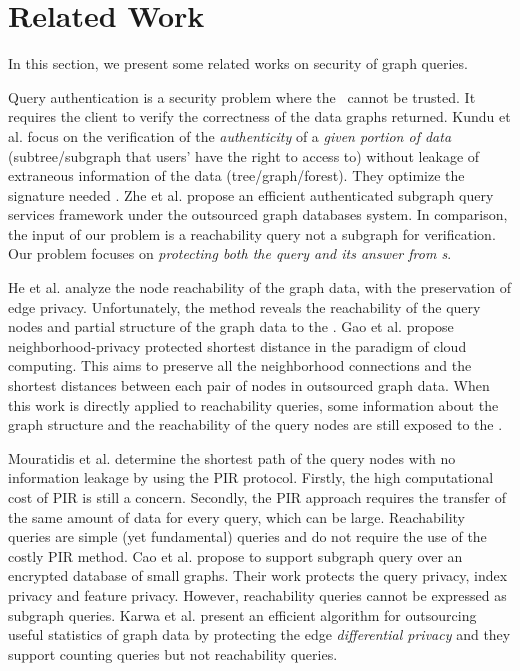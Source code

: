 \vspace{-2ex}
\section{Related Work}
\label{sec:related}
\vspace{-2ex}

In this section, we present some related works on security of
graph queries. 


\stab
{} Query authentication
is a security problem where the \SP\ cannot be trusted. It requires the client to verify the correctness
of the data graphs returned.  Kundu et
al. \cite{auth_graph_wo_leaking,signature, forest} focus on the verification of the {\em authenticity} of a
{\em given portion of data} (subtree/subgraph that users' have the
right to access to) without leakage of extraneous information of the
data (tree/graph/forest). They optimize the signature needed
\cite{forest, signature}. 
Zhe et al. \cite{zhe} propose an efficient authenticated subgraph query
services framework under the outsourced graph databases system. 
In comparison, the input of our problem is a
reachability query not a subgraph for verification. Our problem
focuses on {\em protecting both the query and its answer from \SP s}.

\stab
{} He et
al. \cite{edgeprivacy} analyze the node reachability of the graph
data, with the preservation of edge privacy. Unfortunately, the method
reveals the reachability of the query nodes and partial structure of
the graph data to the \SP.  Gao et al.  \cite{Jeffery} propose
neighborhood-privacy protected shortest distance in the paradigm of
cloud computing. This aims to preserve all the neighborhood connections
and the shortest distances between each pair of nodes in outsourced
graph data. When this work is directly applied to reachability
queries, some information about the graph structure and the
reachability of the query nodes are still exposed to the \SP.

Mouratidis et al.  \cite{PIR+SP} determine the shortest path of the query
nodes with no information leakage by using the PIR \cite{PIR}
protocol.  Firstly, the high computational cost of PIR is still a
concern. Secondly, the PIR approach requires the transfer of the
same amount of data for every query, which can be large. Reachability
queries are simple (yet fundamental) queries and do not require the use of
the costly PIR method.  Cao et al. \cite{ICDCS} propose to
support subgraph query over an encrypted database of small graphs.
Their work protects the query privacy, index privacy and feature
privacy. However, reachability queries cannot be expressed as subgraph
queries. Karwa et al. \cite{subgraph+count} present an efficient
algorithm for outsourcing useful statistics of graph data by
protecting the edge {\em differential privacy} and they
support counting queries but not reachability queries.

